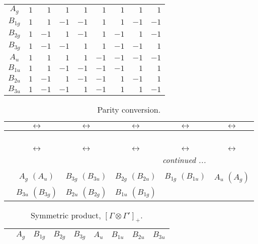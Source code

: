 \documentclass[fleqn,10pt,landscape]{article}
\begin{document}
\begin{itemize}
\begin{center}
\begin{longtable}{c|rrrrrrrr}
$ A_{g} $ & $ 1 $ & $ 1 $ & $ 1 $ & $ 1 $ & $ 1 $ & $ 1 $ & $ 1 $ & $ 1 $ \\
$ B_{1g} $ & $ 1 $ & $ 1 $ & $ -1 $ & $ -1 $ & $ 1 $ & $ 1 $ & $ -1 $ & $ -1 $ \\
$ B_{2g} $ & $ 1 $ & $ -1 $ & $ 1 $ & $ -1 $ & $ 1 $ & $ -1 $ & $ 1 $ & $ -1 $ \\
$ B_{3g} $ & $ 1 $ & $ -1 $ & $ -1 $ & $ 1 $ & $ 1 $ & $ -1 $ & $ -1 $ & $ 1 $ \\
$ A_{u} $ & $ 1 $ & $ 1 $ & $ 1 $ & $ 1 $ & $ -1 $ & $ -1 $ & $ -1 $ & $ -1 $ \\
$ B_{1u} $ & $ 1 $ & $ 1 $ & $ -1 $ & $ -1 $ & $ -1 $ & $ -1 $ & $ 1 $ & $ 1 $ \\
$ B_{2u} $ & $ 1 $ & $ -1 $ & $ 1 $ & $ -1 $ & $ -1 $ & $ 1 $ & $ -1 $ & $ 1 $ \\
$ B_{3u} $ & $ 1 $ & $ -1 $ & $ -1 $ & $ 1 $ & $ -1 $ & $ 1 $ & $ 1 $ & $ -1 $ \\
\end{longtable}
\end{center}
\begin{center}
\renewcommand{\arraystretch}{1.0}
\begin{longtable}{cccccc}
\caption{Parity conversion.}
 \\
 \hline \hline
 & $\leftrightarrow$ & $\leftrightarrow$ & $\leftrightarrow$ & $\leftrightarrow$ & $\leftrightarrow$ \\ \hline \endfirsthead

\multicolumn{5}{l}{\tablename\ \thetable{}} \\
 \hline \hline
 & $\leftrightarrow$ & $\leftrightarrow$ & $\leftrightarrow$ & $\leftrightarrow$ & $\leftrightarrow$ \\ \hline \endhead

 \hline \hline
\multicolumn{5}{r}{\footnotesize\it continued ...} \\ \endfoot

 \hline \hline
\multicolumn{5}{r}{} \\ \endlastfoot

 & $ A_{g}\,\,(A_{u}) $ & $ B_{3g}\,\,(B_{3u}) $ & $ B_{2g}\,\,(B_{2u}) $ & $ B_{1g}\,\,(B_{1u}) $ & $ A_{u}\,\,(A_{g}) $ \\
& $ B_{3u}\,\,(B_{3g}) $ & $ B_{2u}\,\,(B_{2g}) $ & $ B_{1u}\,\,(B_{1g}) $ & $  $ & $  $ \\
\end{longtable}
\end{center}
\begin{center}
\renewcommand{\arraystretch}{1.0}
\begin{longtable}{c|cccccccc}
\caption{Symmetric product, $[\Gamma\otimes\Gamma']_+.$}
 \\
 \hline \hline
 & $ A_{g} $ & $ B_{1g} $ & $ B_{2g} $ & $ B_{3g} $ & $ A_{u} $ & $ B_{1u} $ & $ B_{2u} $ & $ B_{3u} $ \\ \hline \endfirsthead


\end{longtable}
\end{center}
\end{itemize}
\end{document}
